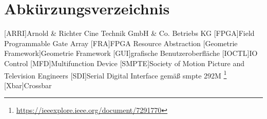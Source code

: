
\chapter{Abk\"urzungsverzeichnis}


\begin{acronym}
	[ARRI]{Arnold \& Richter Cine Technik GmbH \& Co. Betriebs KG}
	[FPGA]{Field Programmable Gate Array}
	[FRA]{FPGA Resource Abstraction}
	[Geometrie Framework]{Geometrie Framework}
	[GUI]{grafische Benutzeroberfläche}
	[IOCTL]{IO Control}
	[MFD]{Multifunction Device}
	[SMPTE]{Society of Motion Picture and Television Engineers}
	[SDI]{Serial Digital Interface} gemäß \ac{smpte} 292M \footnote{\url{https://ieeexplore.ieee.org/document/7291770}}
	[Xbar]{Crossbar}
	
\end{acronym}




